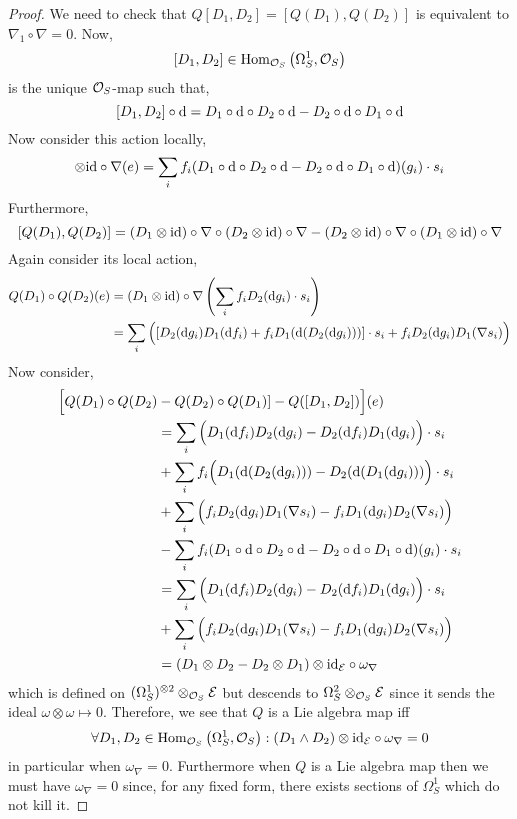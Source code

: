 \documentclass[12pt]{article}
\begin{document}
\begin{proof}
We need to check that $Q[D_1, D_2] = [Q(D_1), Q(D_2)]$ is equivalent to $\nabla_1 \circ \nabla = 0$. Now,
\[ [D_1, D_2] \in \mathrm{Hom}_{\mathcal{O}_{S}} \left( \Omega^1_S, \mathcal{O}_{S} \right) \]
is the unique $\mathcal{O}_{S}$-map such that,
\[ [D_1, D_2] \circ \mathrm{d} = D_1 \circ \mathrm{d} \circ D_2 \circ \mathrm{d} - D_2 \circ \mathrm{d} \circ D_1 \circ \mathrm{d} \]
Now consider this action locally,
\begin{align*}
[D_1, D_2] \otimes \id \circ \nabla(e) = \sum_i f_i (D_1 \circ \d \circ D_2 \circ \d - D_2 \circ \d \circ D_1 \circ \d)(g_i) \cdot s_i 
\end{align*}
Furthermore, 
\[ [Q(D_1), Q(D_2)] = (D_1 \otimes \mathrm{id}) \circ \nabla \circ (D_2 \otimes \mathrm{id}) \circ \nabla - (D_2 \otimes \mathrm{id}) \circ \nabla \circ (D_1 \otimes \mathrm{id}) \circ \nabla \]
Again consider its local action,
\begin{align*}
Q(D_1) \circ  Q(D_2)(e) & = (D_1 \otimes \mathrm{id}) \circ \nabla \left( \sum_i f_i D_2(\mathrm{d}{g_i}) \cdot s_i \right) 
\\
& = \sum_i \Big( [D_2(\mathrm{d}{g_i}) D_1(\mathrm{d}{f_i}) + f_i D_1(\mathrm{d}{(D_2(\mathrm{d}{g_i}))}) ] \cdot s_i + f_i D_2(\mathrm{d}{g_i}) D_1( \nabla s_i ) \Big)
\end{align*}
Now consider,
\begin{align*}
\Big[ Q(D_1) \circ Q(D_2) & - Q(D_2) \circ Q(D_1)] - Q([D_1, D_2]) \Big](e)
\\
& = \sum_i \Big( D_1(\mathrm{d}{f_i}) D_2(\mathrm{d}{g_i}) - D_2(\mathrm{d}{f_i}) D_1(\mathrm{d}{g_i})  \Big) \cdot s_i
\\
& + \sum_i f_i \Big(D_1(\mathrm{d}{(D_2(\mathrm{d}{g_i}))}) - D_2(\mathrm{d}{(D_1(\mathrm{d}{g_i}))}) \Big) \cdot s_i
\\
& +  \sum_i  \Big( f_i D_2(\mathrm{d}{g_i}) D_1(\nabla s_i) - f_i D_1(\mathrm{d}{g_i}) D_2(\nabla s_i) \Big)
\\
& - \sum_i f_i (D_1 \circ \mathrm{d} \circ D_2 \circ \mathrm{d} - D_2 \circ \mathrm{d} \circ D_1 \circ \mathrm{d})(g_i) \cdot s_i
\\
& = \sum_i \Big( D_1(\mathrm{d}{f_i}) D_2(\mathrm{d}{g_i}) - D_2(\mathrm{d}{f_i}) D_1(\mathrm{d}{g_i})  \Big) \cdot s_i 
\\
& +  \sum_i  \Big( f_i D_2(\mathrm{d}{g_i}) D_1(\nabla s_i) - f_i D_1(\mathrm{d}{g_i}) D_2(\nabla s_i) \Big)
\\
& = (D_1 \otimes D_2 - D_2 \otimes D_1) \otimes \mathrm{id}_{\mathcal{E}} \circ \omega_\nabla 
\end{align*}
which is defined on $(\Omega^1_S)^{\otimes 2} \otimes_{\mathcal{O}_{S}} \mathcal{E}$ but descends to $\Omega^2_S \otimes_{\mathcal{O}_{S}} \mathcal{E}$ since it sends the ideal $\omega \otimes \omega \mapsto 0$. Therefore, we see that $Q$ is a Lie algebra map iff
\[ \forall D_1, D_2 \in \mathrm{Hom}_{\mathcal{O}_{S}} \left( \Omega^1_S, \mathcal{O}_{S} \right) : (D_1 \wedge D_2) \otimes \mathrm{id}_{\mathcal{E}} \circ \omega_\nabla = 0 \]
in particular when $\omega_\nabla = 0$. Furthermore when $Q$ is a Lie algebra map then we must have $\omega_\nabla = 0$ since, for any fixed form, there exists sections of $\Omega^1_S$ which do not kill it. 
\end{proof}
\end{document}
